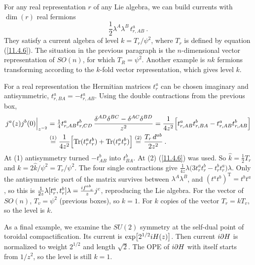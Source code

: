 For any real representation $r$ of any Lie algebra, we can build currents with $\operatorname{dim}(r)$ real fermions
\begin{equation}
	\frac{1}{2}\lambda^{A}\lambda^{B}\,t_{r,AB}^{a} \:. \label{11.5.17}
\end{equation}
They satisfy a current algebra of level $k=T_{r}/\psi^{2}$, where $T_{r}$ is defined by equation (\ref{11.4.6}). The situation in the previous paragraph is the $n$-dimensional vector representation of $SO(n)$, for which $T_{R}=\psi^{2}$. Another example is $nk$ fermions transforming according to the $k$-fold vector representation, which gives level $k$.
\begin{tcolorbox}[breakable]
	\begin{remark}
		For a real representation the Hermitian matrices $t^{a}_{r}$ can be chosen imaginary and antisymmetric, $t^{a}_{r,BA}=-t^{a}_{r,AB}$. Using the double contractions from the previous box,
		\begin{align*}
			j^{a}(z)j^{b}(0)\Big|_{z^{-2}}&=\tfrac{1}{4}t^{a}_{r,AB}t^{b}_{r,CD}\,\frac{\delta^{AD}\delta^{BC}-\delta^{AC}\delta^{BD}}{z^{2}}
			=\frac{1}{4z^{2}}\Bigl[t^{a}_{r,AB}t^{b}_{r,BA}-t^{a}_{r,AB}t^{b}_{r,AB}\Bigr]\\
			&\overset{(1)}{=}\frac{1}{4z^{2}}\Bigl[\operatorname{Tr}(t^{a}_{r}t^{b}_{r})+\operatorname{Tr}(t^{a}_{r}t^{b}_{r})\Bigr]\overset{(2)}{=}\frac{T_{r}\,d^{ab}}{2z^{2}}\:.
		\end{align*}
		At (1) antisymmetry turned $-t^{b}_{AB}$ into $t^{b}_{BA}$. At (2) (\ref{11.4.6}) was used. So $\hat{k}=\frac{1}{2}T_{r}$ and $k=2\hat{k}/\psi^{2}=T_{r}/\psi^{2}$. The four single contractions give $\frac{1}{4z}\lambda\bigl(3t^{a}_{r}t^{b}_{r}-t^{b}_{r}t^{a}_{r}\bigr)\lambda$. Only the antisymmetric part of the matrix survives between $\lambda^{A}\lambda^{B}$, and $(t^{a}t^{b})^{\mathrm{T}}=t^{b}t^{a}$, so this is $\frac{1}{2z}\lambda[t^{a}_{r},t^{b}_{r}]\lambda=\frac{\mi f\indices{^a^b_c}}{z}j^{c}$, reproducing the Lie algebra. For the vector of $SO(n)$, $T_{v}=\psi^{2}$ (previous boxes), so $k=1$. For $k$ copies of the vector $T_{r}=kT_{v}$, so the level is $k$.
	\end{remark}
\end{tcolorbox}

As a final example, we examine the $SU(2)$ symmetry at the self-dual point of toroidal compactification. Its current is $\exp[2^{1/2}i H(z)]$. Then current $i\partial H$ is normalized to weight $2^{1/2}$ and length $\sqrt{2}$. The OPE of $i\partial H$ with itself starts from $1/z^{2}$, so the level is still $k=1$.

